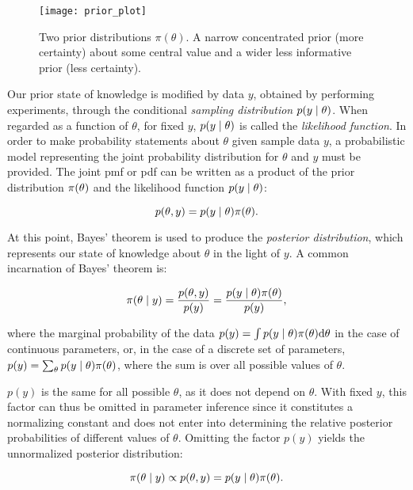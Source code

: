 \begin{figure}[H]
    \centering
    \texttt{[image: prior\_plot]}
    \caption{Two prior distributions $\pi (\theta)$. A narrow concentrated prior (more certainty) about some central value and a wider less informative prior (less certainty).}
    \label{fig:prior_illustration}
\end{figure}

Our prior state of knowledge is modified by data $y$, obtained by performing experiments, through the conditional \textit{sampling distribution} $p \qty(y \mid \theta)$. When regarded as a function of $\theta$, for fixed $y$, $p \qty(y \mid \theta)$ is called the \textit{likelihood function}. In order to make probability statements about $\theta$ given sample data $y$, a probabilistic model representing the joint probability distribution for $\theta$ and $y$ must be provided. The joint pmf or pdf can be written as a product of the prior distribution $\pi \qty(\theta)$ and the likelihood function $p \qty(y \mid \theta)$:

\begin{equation*}
    p(\theta, y) = p \qty(y \mid \theta) \pi \qty(\theta) .
\end{equation*}

At this point, Bayes' theorem is used to produce the \textit{posterior distribution}, which represents our state of knowledge about $\theta$ in the light of $y$. A common incarnation of Bayes' theorem is:

\begin{equation}\label{eq:bayes_theorem}
    \pi \qty(\theta \mid y) = \frac{p(\theta, y)}{p(y)}  = \frac{p \qty(y \mid \theta) \pi \qty(\theta)}{p(y)},
\end{equation}

where the marginal probability of the data $p(y) = \int p \qty(y \mid \theta) \pi \qty(\theta) \dd \theta$ in the case of continuous parameters, or, in the case of a discrete set of parameters, $p(y) = \sum_\theta p \qty(y \mid \theta) \pi \qty(\theta)$, where the sum is over all possible values of $\theta$.

$p(y)$ is the same for all possible $\theta$, as it does not depend on $\theta$. With fixed $y$, this factor can thus be omitted in parameter inference since it constitutes a normalizing constant and does not enter into determining the relative posterior probabilities of different values of $\theta$. Omitting the factor $p(y)$ yields the unnormalized posterior distribution: 

\begin{equation}\label{eq:bayes_unnorm}
    \pi \qty(\theta \mid y) \propto p(\theta, y) =  p \qty(y \mid \theta) \pi \qty(\theta) .
\end{equation}

